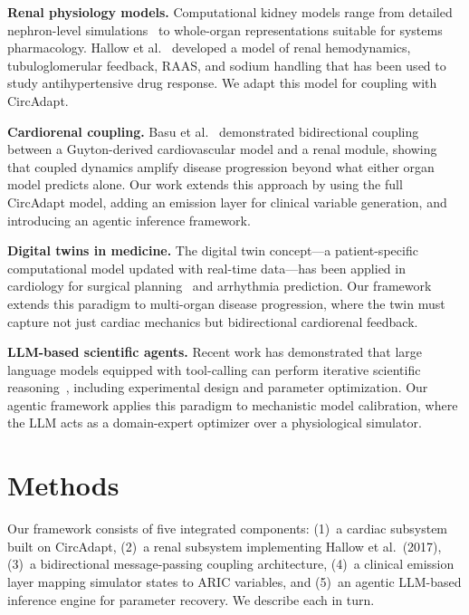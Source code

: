 \documentclass[pmlr]{jmlr}
\begin{document}
\textbf{Renal physiology models.}
Computational kidney models range from detailed nephron-level simulations~\citep{weinstein2007} to whole-organ representations suitable for systems pharmacology. Hallow et al.~\citep{hallow2017} developed a model of renal hemodynamics, tubuloglomerular feedback, RAAS, and sodium handling that has been used to study antihypertensive drug response. We adapt this model for coupling with CircAdapt.

\textbf{Cardiorenal coupling.}
Basu et al.~\citep{basu2023} demonstrated bidirectional coupling between a Guyton-derived cardiovascular model and a renal module, showing that coupled dynamics amplify disease progression beyond what either organ model predicts alone. Our work extends this approach by using the full CircAdapt model, adding an emission layer for clinical variable generation, and introducing an agentic inference framework.

\textbf{Digital twins in medicine.}
The digital twin concept---a patient-specific computational model updated with real-time data---has been applied in cardiology for surgical planning~\citep{corral2020} and arrhythmia prediction. Our framework extends this paradigm to multi-organ disease progression, where the twin must capture not just cardiac mechanics but bidirectional cardiorenal feedback.

\textbf{LLM-based scientific agents.}
Recent work has demonstrated that large language models equipped with tool-calling can perform iterative scientific reasoning~\citep{boiko2023}, including experimental design and parameter optimization. Our agentic framework applies this paradigm to mechanistic model calibration, where the LLM acts as a domain-expert optimizer over a physiological simulator.


\section{Methods}
\label{sec:methods}

Our framework consists of five integrated components: (1)~a cardiac subsystem built on CircAdapt, (2)~a renal subsystem implementing Hallow et al.\ (2017), (3)~a bidirectional message-passing coupling architecture, (4)~a clinical emission layer mapping simulator states to ARIC variables, and (5)~an agentic LLM-based inference engine for parameter recovery. We describe each in turn.
\end{document}
